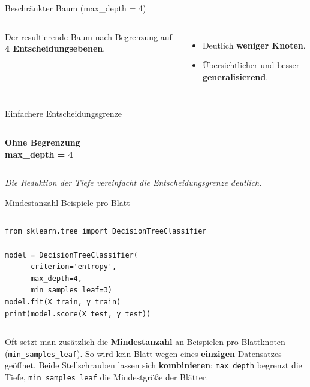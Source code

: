 \begin{frame}{Beschränkter Baum (max\_depth = 4)}
\begin{columns}
\centering


Der resultierende Baum nach Begrenzung auf \textbf{4 Entscheidungsebenen}.

\vspace{0.4em}
\begin{itemize}
  \item Deutlich \textbf{weniger Knoten}.
  \item Übersichtlicher und besser \textbf{generalisierend}.
\end{itemize}
\end{columns}
\end{frame}

\begin{frame}{Einfachere Entscheidungsgrenze}
\begin{columns}
\centering
\textbf{Ohne Begrenzung}\\[4pt]


\centering
\textbf{max\_depth = 4}\\[4pt]

\end{columns}

\vspace{0.6em}
\centering
{\footnotesize\itshape Die Reduktion der Tiefe vereinfacht die
Entscheidungsgrenze deutlich.}
\end{frame}

\begin{frame}[fragile]{Mindestanzahl Beispiele pro Blatt}
\begin{columns}
\begin{verbatim}
from sklearn.tree import DecisionTreeClassifier

model = DecisionTreeClassifier(
      criterion='entropy',
      max_depth=4,
      min_samples_leaf=3)
model.fit(X_train, y_train)
print(model.score(X_test, y_test))
\end{verbatim}

\centering

\end{columns}

\vspace{0.5em}
\footnotesize
Oft setzt man zusätzlich die \textbf{Mindestanzahl} an Beispielen pro
Blattknoten (\texttt{min\_samples\_leaf}). So wird kein Blatt wegen eines
\textbf{einzigen} Datensatzes geöffnet. Beide Stellschrauben lassen sich
\textbf{kombinieren}: \texttt{max\_depth} begrenzt die Tiefe,
\texttt{min\_samples\_leaf} die Mindestgröße der Blätter.
\end{frame}


